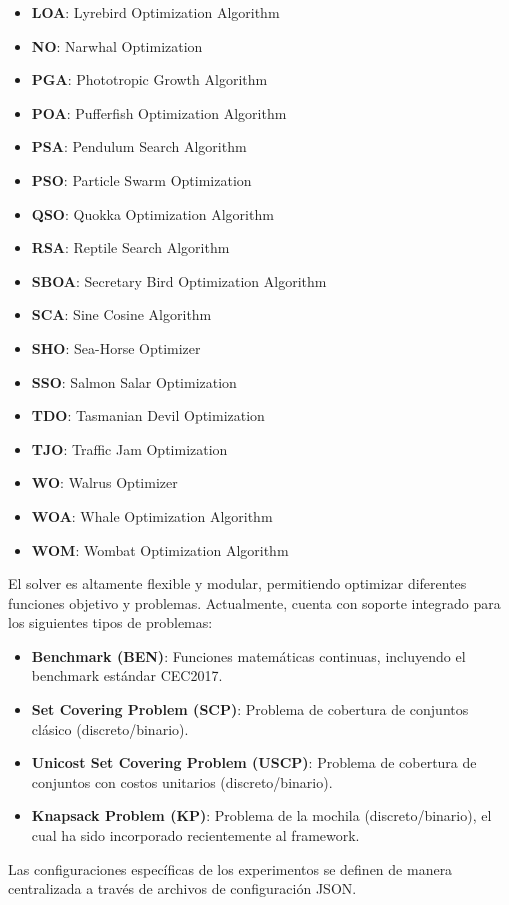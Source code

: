 \begin{itemize}
    \item \textbf{LOA}: Lyrebird Optimization Algorithm
    \item \textbf{NO}: Narwhal Optimization
    \item \textbf{PGA}: Phototropic Growth Algorithm
    \item \textbf{POA}: Pufferfish Optimization Algorithm
    \item \textbf{PSA}: Pendulum Search Algorithm
    \item \textbf{PSO}: Particle Swarm Optimization
    \item \textbf{QSO}: Quokka Optimization Algorithm
    \item \textbf{RSA}: Reptile Search Algorithm
    \item \textbf{SBOA}: Secretary Bird Optimization Algorithm
    \item \textbf{SCA}: Sine Cosine Algorithm
    \item \textbf{SHO}: Sea-Horse Optimizer
    \item \textbf{SSO}: Salmon Salar Optimization
    \item \textbf{TDO}: Tasmanian Devil Optimization
    \item \textbf{TJO}: Traffic Jam Optimization
    \item \textbf{WO}: Walrus Optimizer
    \item \textbf{WOA}: Whale Optimization Algorithm
    \item \textbf{WOM}: Wombat Optimization Algorithm
\end{itemize}

El solver es altamente flexible y modular, permitiendo optimizar diferentes funciones objetivo y problemas. Actualmente, cuenta con soporte integrado para los siguientes tipos de problemas:
\begin{itemize}
    \item \textbf{Benchmark (BEN)}: Funciones matemáticas continuas, incluyendo el benchmark estándar CEC2017.
    \item \textbf{Set Covering Problem (SCP)}: Problema de cobertura de conjuntos clásico (discreto/binario).
    \item \textbf{Unicost Set Covering Problem (USCP)}: Problema de cobertura de conjuntos con costos unitarios (discreto/binario).
    \item \textbf{Knapsack Problem (KP)}: Problema de la mochila (discreto/binario), el cual ha sido incorporado recientemente al framework.
\end{itemize}

Las configuraciones específicas de los experimentos se definen de manera centralizada a través de archivos de configuración JSON.
